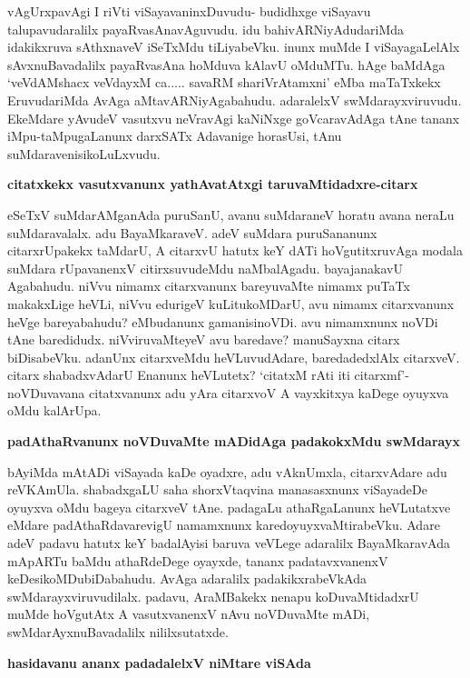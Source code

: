 \noindent
vAgUrxpavAgi I riVti viSayavaninxDuvudu- budidhxge viSayavu talupavudaralilx payaRvasAna\-vAguvudu. idu bahivARNiyAdudariMda idakikxruva sAthxnaveV iSeTxMdu tiLiyabeVku. inunx muMde I viSayagaLelAlx sAvxnuBavadalilx payaRvasAna hoMduva kAlavU oMduMTu. hAge baMdAga\- `veV\-dAMshacx veVdayxM ca..... savaRM shariVrAtamxni' eMba maTaTxkekx EruvudariMda AvAga aMtavARNiyAga\-bahudu. adaralelxV swMdarayxviruvudu. EkeMdare yAvudeV vasutxvu neVravAgi kaNiNxge goVcaravAdAga tAne tananx iMpu-taMpugaLanunx darxSATx Adavanige horasUsi, tAnu suMdaravenisikoLuLxvudu.

{\bigskip
\noindent
{\large\bf citatxkekx vasutxvanunx yathAvatAtxgi taruvaMtidadxre-citarx}}\label{page200}
\medskip

\noindent
eSeTxV suMdarAMganAda puruSanU, avanu suMdaraneV horatu avana neraLu suMdaravalalx. adu BayaMkaraveV. adeV suMdara puruSananunx citarxrUpakekx taMdarU, A citarxvU hatutx keY dATi hoVgutitxru\-vAga modala suMdara rUpavanenxV citirxsuvudeMdu naMbalAgadu. bayajanakavU Agabahudu. niVvu nimamx citarxvanunx bareyuvaMte nimamx puTaTx makakxLige heVLi, niVvu edurigeV kuLitukoMDarU, avu nimamx citarxvanunx heVge bareyabahudu? eMbudanunx gamanisinoVDi. avu nimamxnunx noVDi tAne baredidudx. niVviruvaMteyeV avu baredave? manuSayxna citarx biDisabeVku. adanUnx citarxveMdu heVLuvudAdare, baredadedxlAlx citarxveV. citarx shabadxvAdarU Enanunx heVLutetx? `citatxM rAti iti citarxmf'-noVDuva\-vana citatx\-vanunx adu yAra citarxvoV A vayxkitxya kaDege oyuyxva oMdu kalArUpa.

{\bigskip
\noindent
{\large\bf padAthaRvanunx noVDuvaMte mADidAga padakokxMdu swMdarayx}}\label{page201}
\medskip

\noindent
bAyiMda mAtADi viSayada kaDe oyadxre, adu vAknUmxla, citarxvAdare adu reVKAmUla. shabadx\-gaLU saha shorxVtaqvina manasasxnunx viSayadeDe oyuyxva oMdu bageya citarxveV tAne. padagaLu athaRga\-Lanunx heVLutatxve eMdare padAthaRdavarevigU namamxnunx karedoyuyxvaMtirabeVku. Adare adeV padavu hatutx keY badalAyisi baruva veVLege adaralilx BayaMkaravAda mApARTu baMdu athaRdeDege oyayxde,\- tananx padatavxvanenxV keDesikoMDubiDabahudu. AvAga adaralilx padakikxrabeVkAda swMdarayxviruvu\-dilalx. padavu,\- AraMBakekx nenapu koDuvaMtidadxrU muMde hoVgutAtx A vasutxvanenxV nAvu noVDuvaMte mADi, swMdarAyxnuBavadalilx nililxsutatxde.

\eject

{\noindent
{\large\bf hasidavanu ananx padadalelxV niMtare viSAda}}\label{page201}
\medskip

